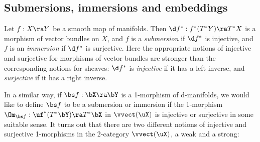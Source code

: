 \documentclass{article}
\begin{document}
\subsection{Submersions, immersions and embeddings}
\label{ds45}

Let $f:X\ra Y$ be a smooth map of manifolds. Then $\d
f^*:f^*(T^*Y)\ra T^*X$ is a morphism of vector bundles on $X$, and
$f$ is a {\it submersion\/} if $\d f^*$ is injective, and $f$ is an
{\it immersion\/} if $\d f^*$ is surjective. Here the appropriate
notions of injective and surjective for morphisms of vector bundles
are stronger than the corresponding notions for sheaves: $\d f^*$ is
{\it injective\/} if it has a left inverse, and {\it surjective\/}
if it has a right inverse.

In a similar way, if $\bs f:\bX\ra\bY$ is a 1-morphism of
d-manifolds, we would like to define $\bs f$ to be a submersion or
immersion if the 1-morphism $\Om_{\bs f}:\uf^*(T^*\bY)\ra T^*\bX$ in
$\vvect(\uX)$ is injective or surjective in some suitable sense. It
turns out that there are two different notions of injective and
surjective 1-morphisms in the 2-category $\vvect(\uX)$, a weak and a
strong:
\end{document}
